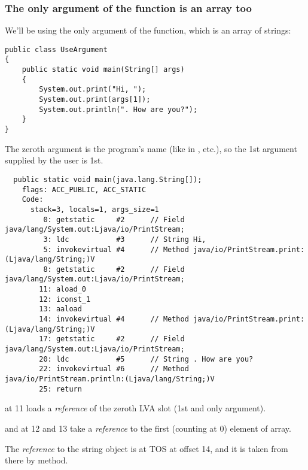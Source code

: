 \subsubsection{The only argument of the \main function is an array too}

We'll be using the only argument of the \main function, which is an array of strings:


\begin{lstlisting}[style=customjava]
public class UseArgument
{
	public static void main(String[] args)
	{
		System.out.print("Hi, ");
		System.out.print(args[1]);
		System.out.println(". How are you?");
	}
}
\end{lstlisting}

The zeroth argument is the program's name (like in \CCpp, etc.), 
so the 1st argument supplied by the user is 1st.


\begin{lstlisting}
  public static void main(java.lang.String[]);
    flags: ACC_PUBLIC, ACC_STATIC
    Code:
      stack=3, locals=1, args_size=1
         0: getstatic     #2      // Field java/lang/System.out:Ljava/io/PrintStream;
         3: ldc           #3      // String Hi, 
         5: invokevirtual #4      // Method java/io/PrintStream.print:(Ljava/lang/String;)V
         8: getstatic     #2      // Field java/lang/System.out:Ljava/io/PrintStream;
        11: aload_0       
        12: iconst_1      
        13: aaload        
        14: invokevirtual #4      // Method java/io/PrintStream.print:(Ljava/lang/String;)V
        17: getstatic     #2      // Field java/lang/System.out:Ljava/io/PrintStream;
        20: ldc           #5      // String . How are you?
        22: invokevirtual #6      // Method java/io/PrintStream.println:(Ljava/lang/String;)V
        25: return        
\end{lstlisting}

 at 11 loads a \emph{reference} of the zeroth \ac{LVA} slot 
(1st and only \main argument).

 and  at 12 and 13 take a \emph{reference} to the first (counting at 0) 
element of array.

The \emph{reference} to the string object is at \ac{TOS} at offset 14, and it is 
taken from there by  method.

